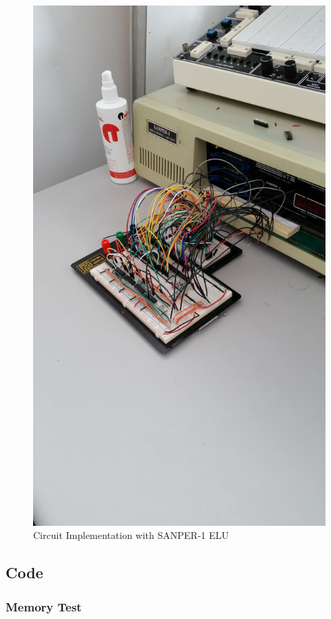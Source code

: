 \documentclass[12pt, twocolumn]{article}
\begin{document}
\begin{figure}[H]
\centering
\includegraphics[width=1\linewidth]{connected}
\caption{Circuit Implementation with SANPER-1 ELU}
\label{fig:connected}
\end{figure}

\subsection{Code}\label{code}
\subsubsection{Memory Test}\label{sec:memtest}
\lstset{language=[Motorola68k]Assembler}

\end{document}
